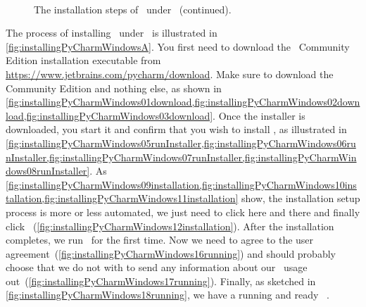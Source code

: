 %
\begin{figure}%
\ContinuedFloat%
\centering%
%
\strut\hfill\strut%
%
%
\strut\hfill\strut\strut\hfill\strut%
%
%
\strut\hfill\strut%
%
\\[10pt]%
%
\strut\hfill\strut%
%
%
\strut\hfill\strut\strut\hfill\strut%
%
%
\strut\hfill\strut%
%
\caption[]{The installation steps of \pycharm\ under \windows~(continued).}%
\label{fig:installingPyCharmWindowsC}%
\end{figure}%
%
The process of installing \pycharm\ under \windows\ is illustrated in \cref{fig:installingPyCharmWindowsA}.
You first need to download the \pycharm\ Community Edition installation executable from \url{https://www.jetbrains.com/pycharm/download}.
Make sure to download the Community Edition and nothing else, as shown in \cref{fig:installingPyCharmWindows01download,fig:installingPyCharmWindows02download,fig:installingPyCharmWindows03download}.
Once the installer is downloaded, you start it and confirm that you wish to install \pycharm, as illustrated in \cref{fig:installingPyCharmWindows05runInstaller,fig:installingPyCharmWindows06runInstaller,fig:installingPyCharmWindows07runInstaller,fig:installingPyCharmWindows08runInstaller}.
As \cref{fig:installingPyCharmWindows09installation,fig:installingPyCharmWindows10installation,fig:installingPyCharmWindows11installation} show, the installation setup process is more or less automated, we just need to click  here and there and finally click ~(\cref{fig:installingPyCharmWindows12installation}).
After the installation completes, we run \pycharm\ for the first time.
Now we need to agree to the user agreement~(\cref{fig:installingPyCharmWindows16running}) and should probably choose that we do not with to send any information about our \pycharm\ usage out~(\cref{fig:installingPyCharmWindows17running}).
Finally, as sketched in \cref{fig:installingPyCharmWindows18running}, we have a running and ready \pycharm\ .%
%
\endhsection%
%
